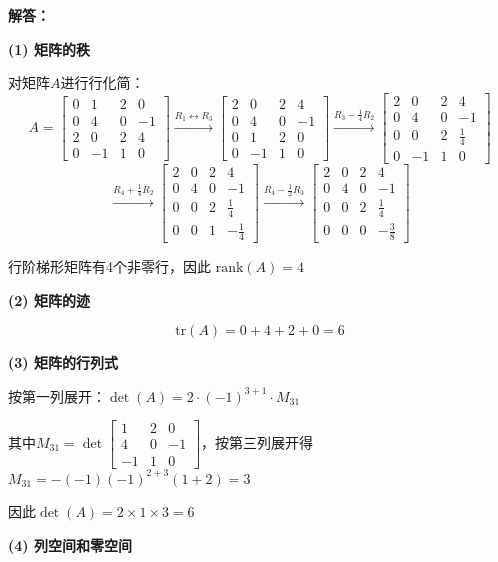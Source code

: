 \documentclass[12pt,a4paper]{article}
\begin{document}
	\textbf{解答：}
	
	\textbf{(1) 矩阵的秩}
	
	对矩阵$A$进行行化简：
	$$A = \begin{bmatrix} 0&1&2&0\\ 0&4&0&-1\\ 2&0&2&4\\ 0&-1&1&0 \end{bmatrix} \xrightarrow{R_1 \leftrightarrow R_3} \begin{bmatrix} 2&0&2&4\\ 0&4&0&-1\\ 0&1&2&0\\ 0&-1&1&0 \end{bmatrix} \xrightarrow{R_3 - \frac{1}{4}R_2} \begin{bmatrix} 2&0&2&4\\ 0&4&0&-1\\ 0&0&2&\frac{1}{4}\\ 0&-1&1&0 \end{bmatrix}$$
	$$\xrightarrow{R_4 + \frac{1}{4}R_2} \begin{bmatrix} 2&0&2&4\\ 0&4&0&-1\\ 0&0&2&\frac{1}{4}\\ 0&0&1&-\frac{1}{4} \end{bmatrix} \xrightarrow{R_4 - \frac{1}{2}R_3} \begin{bmatrix} 2&0&2&4\\ 0&4&0&-1\\ 0&0&2&\frac{1}{4}\\ 0&0&0&-\frac{3}{8} \end{bmatrix}$$
	
	行阶梯形矩阵有4个非零行，因此 $\text{rank}(A) = 4$
	
	\textbf{(2) 矩阵的迹}
	
	$$\text{tr}(A) = 0 + 4 + 2 + 0 = 6$$
	
	\textbf{(3) 矩阵的行列式}
	
	按第一列展开：$\det(A) = 2 \cdot (-1)^{3+1} \cdot M_{31}$
	
	其中$M_{31} = \det\begin{bmatrix} 1&2&0\\ 4&0&-1\\ -1&1&0 \end{bmatrix}$，按第三列展开得$M_{31} = -(-1)(-1)^{2+3}(1+2) = 3$
	
	因此$\det(A) = 2 \times 1 \times 3 = 6$
	
	\textbf{(4) 列空间和零空间}
	
\end{document}
